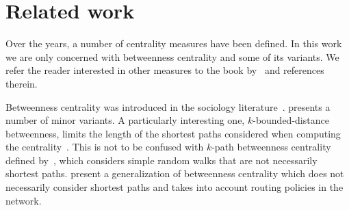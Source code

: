 \section{Related work}\label{sec:prevwork}
Over the years, a number of centrality measures have been defined. In this work
we are only concerned with betweenness centrality and some of its variants. We
refer the reader interested in other measures to the book by~\citet{Newman10} and
references therein.

Betweenness centrality was introduced in the sociology
literature~\citep{Anthonisse71,Freeman77}. \citet{Brandes08} presents a number
of minor variants. A particularly interesting one, $k$-bounded-distance
betweenness, limits the length of the shortest paths considered when computing
the centrality~\citep{BorgattiE06,Brandes08,PfefferC12}. This is not to be
confused with $k$-path betweenness centrality defined
by~\citet{KourtellisASIT12}, which considers simple random walks that are not
necessarily shortest paths. \citet{DolevEP10} present a generalization of
betweenness centrality which does not necessarily consider shortest paths and
takes into account routing policies in the network. 

